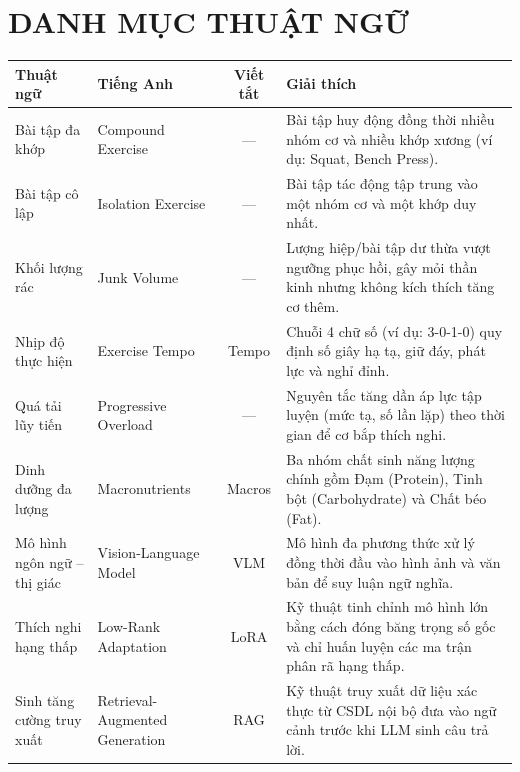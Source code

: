 
\chapter*{DANH MỤC THUẬT NGỮ}


\begin{table}[htbp]
\centering
\begin{tabularx}{\textwidth}{>{\raggedright\arraybackslash}p{3.0cm} >{\raggedright\arraybackslash}p{3.4cm} c >{\raggedright\arraybackslash}X}
    \toprule
    \textbf{Thuật ngữ} & \textbf{Tiếng Anh} & \textbf{Viết tắt} & \textbf{Giải thích} \\
    \midrule
    Bài tập đa khớp & Compound Exercise & --- & Bài tập huy động đồng thời nhiều nhóm cơ và nhiều khớp xương (ví dụ: Squat, Bench Press). \\
    Bài tập cô lập & Isolation Exercise & --- & Bài tập tác động tập trung vào một nhóm cơ và một khớp duy nhất. \\
    Khối lượng rác & Junk Volume & --- & Lượng hiệp/bài tập dư thừa vượt ngưỡng phục hồi, gây mỏi thần kinh nhưng không kích thích tăng cơ thêm. \\
    Nhịp độ thực hiện & Exercise Tempo & Tempo & Chuỗi 4 chữ số (ví dụ: 3-0-1-0) quy định số giây hạ tạ, giữ đáy, phát lực và nghỉ đỉnh. \\
    Quá tải lũy tiến & Progressive Overload & --- & Nguyên tắc tăng dần áp lực tập luyện (mức tạ, số lần lặp) theo thời gian để cơ bắp thích nghi. \\
    Dinh dưỡng đa lượng & Macronutrients & Macros & Ba nhóm chất sinh năng lượng chính gồm Đạm (Protein), Tinh bột (Carbohydrate) và Chất béo (Fat). \\
    Mô hình ngôn ngữ -- thị giác & Vision-Language Model & VLM & Mô hình đa phương thức xử lý đồng thời đầu vào hình ảnh và văn bản để suy luận ngữ nghĩa. \\
    Thích nghi hạng thấp & Low-Rank Adaptation & LoRA & Kỹ thuật tinh chỉnh mô hình lớn bằng cách đóng băng trọng số gốc và chỉ huấn luyện các ma trận phân rã hạng thấp. \\
    Sinh tăng cường truy xuất & Retrieval-Augmented Generation & RAG & Kỹ thuật truy xuất dữ liệu xác thực từ CSDL nội bộ đưa vào ngữ cảnh trước khi LLM sinh câu trả lời. \\
    \bottomrule
\end{tabularx}
\end{table}

\clearpage
